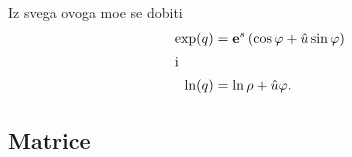 Iz svega ovoga mo{\zv}e se dobiti
\begin{align}
    \exp(q) &= {\bf e}^s \left( \cos\varphi + {\hat u}\sin\varphi \right)\\
    \intertext{i}
    \ln(q)  &= \ln\rho + {\hat u}\varphi.
\end{align}


\newpage

\subsection{Matrice}

\newpage
